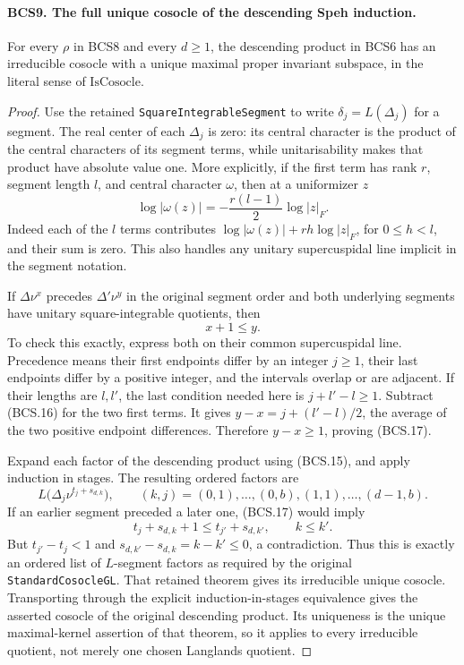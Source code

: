 \documentclass[11pt,a4paper]{article}
\numberwithin{equation}{section}
\theoremstyle{remark}\newtheorem{remark}[theorem]{Remark}
\begin{document}
\paragraph{BCS9. The full unique cosocle of the descending Speh induction.}
\label{claim:BCS9}
For every \(\rho\) in BCS8 and every \(d\ge1\), the descending
product in BCS6 has an irreducible cosocle with a unique maximal
proper invariant subspace, in the literal sense of
\(\mathrm{IsCosocle}\).
\begin{proof}
Use the retained \texttt{Square\allowbreak Integrable\allowbreak Segment} to write
\(\delta_j=L(\Delta_j)\) for a segment.  The real center of each
\(\Delta_j\) is zero: its central character is the product of the
central characters of its segment terms, while unitarisability makes
that product have absolute value one.  More explicitly, if the first
term has rank \(r\), segment length \(l\), and central character
\(\omega\), then at a uniformizer \(z\)
\[
 \log|\omega(z)|=-\frac{r(l-1)}2\log|z|_F.
 \tag{BCS.16}
\]
Indeed each of the \(l\) terms contributes
\(\log|\omega(z)|+rh\log|z|_F\), for \(0\le h<l\),
and their sum is zero.  This also handles any unitary supercuspidal
line implicit in the segment notation.

If \(\Delta\nu^x\) precedes \(\Delta'\nu^y\) in the original
segment order and both underlying segments have unitary
square-integrable quotients, then
\[
                             x+1\le y.
 \tag{BCS.17}
\]
To check this exactly, express both on their common supercuspidal
line.  Precedence means their first endpoints differ by an integer
\(j\ge1\), their last endpoints differ by a positive integer,
and the intervals overlap or are adjacent.  If their lengths are
\(l,l'\), the last condition needed here is \(j+l'-l\ge1\).
Subtract (BCS.16) for the two first terms.  It gives
\(y-x=j+(l'-l)/2\), the average of the two positive endpoint
differences.  Therefore \(y-x\ge1\), proving (BCS.17).

Expand each factor of the descending product using (BCS.15), and
apply induction in stages.  The resulting ordered factors are
\[
          L\bigl(\Delta_j\nu^{t_j+s_{d,k}}\bigr),
       \qquad (k,j)=(0,1),\ldots,(0,b),(1,1),\ldots,(d-1,b).
 \tag{BCS.18}
\]
If an earlier segment preceded a later one, (BCS.17) would imply
\[
        t_j+s_{d,k}+1\le t_{j'}+s_{d,k'},\qquad k\le k'.
\]
But \(t_{j'}-t_j<1\) and
\(s_{d,k'}-s_{d,k}=k-k'\le0\), a contradiction.  Thus this is
exactly an ordered list of \(L\)-segment factors as required by
the original \texttt{Standard\allowbreak Cosocle\allowbreak GL}.  That retained theorem
gives its irreducible unique cosocle.  Transporting through the
explicit induction-in-stages equivalence gives the asserted cosocle
of the original descending product.  Its uniqueness is the unique
maximal-kernel assertion of that theorem, so it applies to every
irreducible quotient, not merely one chosen Langlands quotient.
\end{proof}
\end{document}
